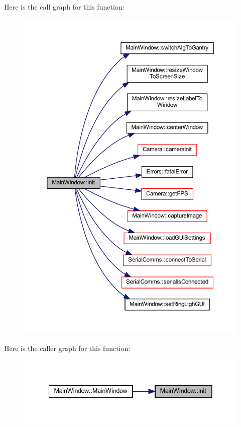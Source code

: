 Here is the call graph for this function\+:
\nopagebreak
\begin{figure}[H]
\begin{center}
\leavevmode
\includegraphics[width=350pt]{classMainWindow_a671e7e5b0a3a7a3fb1cf44c5c8377952_cgraph}
\end{center}
\end{figure}
Here is the caller graph for this function\+:
\nopagebreak
\begin{figure}[H]
\begin{center}
\leavevmode
\includegraphics[width=341pt]{classMainWindow_a671e7e5b0a3a7a3fb1cf44c5c8377952_icgraph}
\end{center}
\end{figure}
\mbox{\label{classMainWindow_a1bc0cb9910e8898744ff85e8326bf73d}} 
